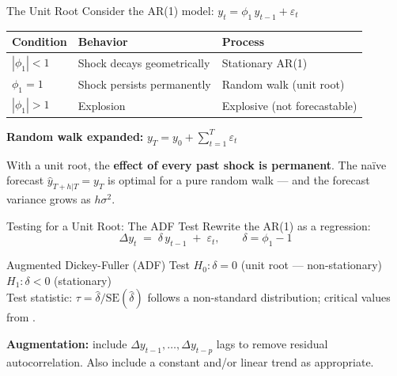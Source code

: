 \documentclass[aspectratio=169, 11pt]{beamer}
\begin{document}

\begin{frame}{The Unit Root}
  Consider the AR(1) model: $y_t = \phi_1\,y_{t-1} + \varepsilon_t$
  \begin{center}
    {\small
    \begin{tabular}{lll}
      \toprule
      \textbf{Condition} & \textbf{Behavior} & \textbf{Process} \\
      \midrule
      $|\phi_1| < 1$ & Shock decays geometrically & Stationary AR(1) \\
      $\phi_1 = 1$   & Shock persists permanently & Random walk (unit root) \\
      $|\phi_1| > 1$ & Explosion & Explosive (not forecastable) \\
      \bottomrule
    \end{tabular}
    }
  \end{center}
  \vspace{0.1cm}
  \textbf{Random walk expanded:} $y_T = y_0 + \sum_{t=1}^{T}\varepsilon_t$
  \begin{warningbox}
    {\small With a unit root, the \textbf{effect of every past shock is permanent}.
    The na\"{i}ve forecast $\hat{y}_{T+h|T} = y_T$ is optimal for a pure
    random walk --- and the forecast variance grows as $h\sigma^2$.}
  \end{warningbox}
\end{frame}

\begin{frame}{Testing for a Unit Root: The ADF Test}
  Rewrite the AR(1) as a regression:
  \[
    \Delta y_t \;=\; \delta\, y_{t-1} \;+\; \varepsilon_t,
    \qquad \delta = \phi_1 - 1
  \]
  \begin{definitionbox}{Augmented Dickey-Fuller (ADF) Test}
    {\small
    $H_0: \delta = 0$ \quad (unit root --- non-stationary)\\[2pt]
    $H_1: \delta < 0$ \quad (stationary)\\[2pt]
    Test statistic: $\tau = \hat{\delta}/\mathrm{SE}(\hat{\delta})$
    follows a non-standard distribution; critical values from
    \textcite{DickeyFuller1979}.}
  \end{definitionbox}
  \textbf{Augmentation:} include $\Delta y_{t-1}, \ldots, \Delta y_{t-p}$
  lags to remove residual autocorrelation. Also include a constant and/or
  linear trend as appropriate.
\end{frame}
\end{document}
